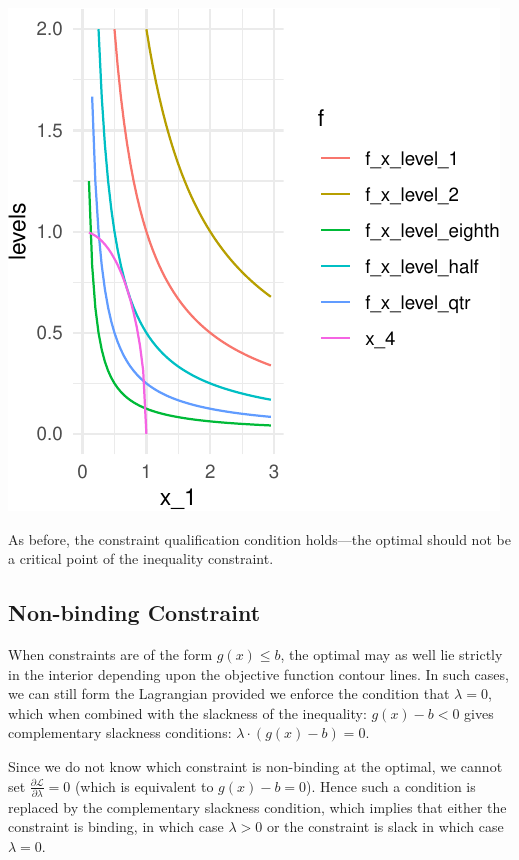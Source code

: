 \documentclass[11pt,]{article}
\begin{document}
\begin{center}\includegraphics{Optimization_2_files/figure-latex/opt_dim_2_ineq-1} \end{center}

As before, the constraint qualification condition holds---the optimal
should not be a critical point of the inequality constraint.

\subsection{Non-binding Constraint}\label{non-binding-constraint}

When constraints are of the form \(g(x)\leq b\), the optimal may as well
lie strictly in the interior depending upon the objective function
contour lines. In such cases, we can still form the Lagrangian provided
we enforce the condition that \(\lambda=0\), which when combined with
the slackness of the inequality: \(g(x)-b<0\) gives complementary
slackness conditions: \(\lambda\cdot (g(x)-b)=0\).

Since we do not know which constraint is non-binding at the optimal, we
cannot set \(\frac{\partial \mathcal{L}}{\partial \lambda}=0\) (which is
equivalent to \(g(x)-b=0\)). Hence such a condition is replaced by the
complementary slackness condition, which implies that either the
constraint is binding, in which case \(\lambda>0\) or the constraint is
slack in which case \(\lambda = 0\).
\end{document}
